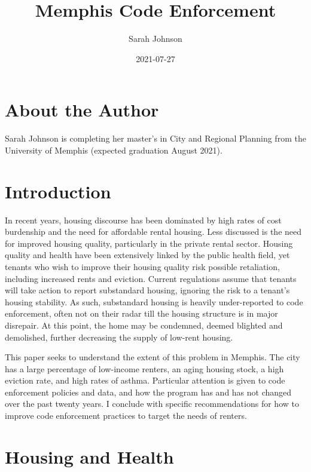 \documentclass[
]{book}
\title{Memphis Code Enforcement}
\author{Sarah Johnson}
\date{2021-07-27}
\begin{document}
\maketitle

{
\setcounter{tocdepth}{1}
\tableofcontents
}
\hypertarget{about-the-author}{%
\chapter*{About the Author}\label{about-the-author}}

Sarah Johnson is completing her master's in City and Regional Planning from the University of Memphis (expected graduation August 2021).

\hypertarget{intro}{%
\chapter{Introduction}\label{intro}}

In recent years, housing discourse has been dominated by high rates of cost burdenship and the need for affordable rental housing. Less discussed is the need for improved housing quality, particularly in the private rental sector. Housing quality and health have been extensively linked by the public health field, yet tenants who wish to improve their housing quality risk possible retaliation, including increased rents and eviction. Current regulations assume that tenants will take action to report substandard housing, ignoring the risk to a tenant's housing stability. As such, substandard housing is heavily under-reported to code enforcement, often not on their radar till the housing structure is in major disrepair. At this point, the home may be condemned, deemed blighted and demolished, further decreasing the supply of low-rent housing.

This paper seeks to understand the extent of this problem in Memphis. The city has a large percentage of low-income renters, an aging housing stock, a high eviction rate, and high rates of asthma. Particular attention is given to code enforcement policies and data, and how the program has and has not changed over the past twenty years. I conclude with specific recommendations for how to improve code enforcement practices to target the needs of renters.

\hypertarget{housing-and-health}{%
\chapter{Housing and Health}\label{housing-and-health}}
\end{document}
